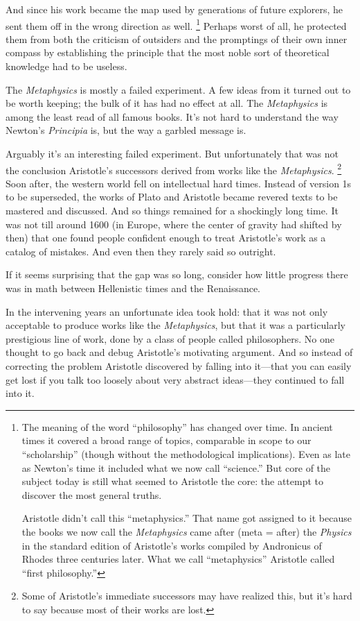 And since his work became the map used by generations of future
explorers, he sent them off in the wrong direction as well.
\footnote{The meaning of the word ``philosophy'' has changed over time. In
ancient times it covered a broad range of topics, comparable in scope to
our ``scholarship'' (though without the methodological implications).
Even as late as Newton's time it included what we now call ``science.''
But core of the subject today is still what seemed to Aristotle the
core: the attempt to discover the most general truths.

Aristotle didn't call this ``metaphysics.'' That name got assigned to it
because the books we now call the \emph{Metaphysics} came after (meta =
after) the \emph{Physics} in the standard edition of Aristotle's works
compiled by Andronicus of Rhodes three centuries later. What we call
``metaphysics'' Aristotle called ``first philosophy.''} Perhaps worst of all, he protected them from
both the criticism of outsiders and the promptings of their own inner
compass by establishing the principle that the most noble sort of
theoretical knowledge had to be useless.

The \emph{Metaphysics} is mostly a failed experiment. A few ideas from
it turned out to be worth keeping; the bulk of it has had no effect at
all. The \emph{Metaphysics} is among the least read of all famous books.
It's not hard to understand the way Newton's \emph{Principia} is, but
the way a garbled message is.

Arguably it's an interesting failed experiment. But unfortunately that
was not the conclusion Aristotle's successors derived from works like
the \emph{Metaphysics}. \footnote{Some of Aristotle's immediate successors may have realized this,
but it's hard to say because most of their works are lost.} Soon after, the western
world fell on intellectual hard times. Instead of version 1s to be
superseded, the works of Plato and Aristotle became revered texts to be
mastered and discussed. And so things remained for a shockingly long
time. It was not till around 1600 (in Europe, where the center of
gravity had shifted by then) that one found people confident enough to
treat Aristotle's work as a catalog of mistakes. And even then they
rarely said so outright.

If it seems surprising that the gap was so long, consider how little
progress there was in math between Hellenistic times and the
Renaissance.

In the intervening years an unfortunate idea took hold: that it was not
only acceptable to produce works like the \emph{Metaphysics}, but that
it was a particularly prestigious line of work, done by a class of
people called philosophers. No one thought to go back and debug
Aristotle's motivating argument. And so instead of correcting the
problem Aristotle discovered by falling into it---that you can easily
get lost if you talk too loosely about very abstract ideas---they
continued to fall into it.

